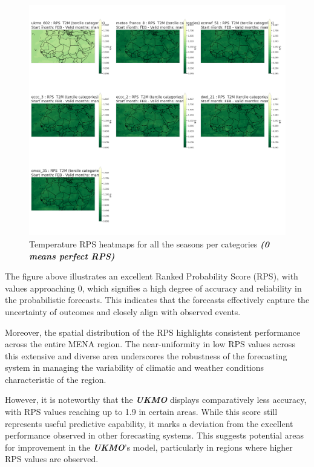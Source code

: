\begin{figure}[H]
    \centering
    \includegraphics[width=1\linewidth]{plots/prob/rps/rps_mam_t2m.png}
    \caption{Temperature RPS  heatmaps for all the seasons per categories \textbf{\textit{(0 means perfect RPS)}}}
\end{figure}

The figure above illustrates an excellent Ranked Probability Score (RPS), with values approaching 0, which signifies a high degree of accuracy and reliability in the probabilistic forecasts. This indicates that the forecasts effectively capture the uncertainty of outcomes and closely align with observed events.

Moreover, the spatial distribution of the RPS highlights consistent performance across the entire MENA region. The near-uniformity in low RPS values across this extensive and diverse area underscores the robustness of the forecasting system in managing the variability of climatic and weather conditions characteristic of the region.

However, it is noteworthy that the \textbf{\textit{UKMO}} displays comparatively less accuracy, with RPS values reaching up to 1.9 in certain areas. While this score still represents useful predictive capability, it marks a deviation from the excellent performance observed in other forecasting systems. This suggests potential areas for improvement in the \textbf{\textit{UKMO}}'s model, particularly in regions where higher RPS values are observed.

